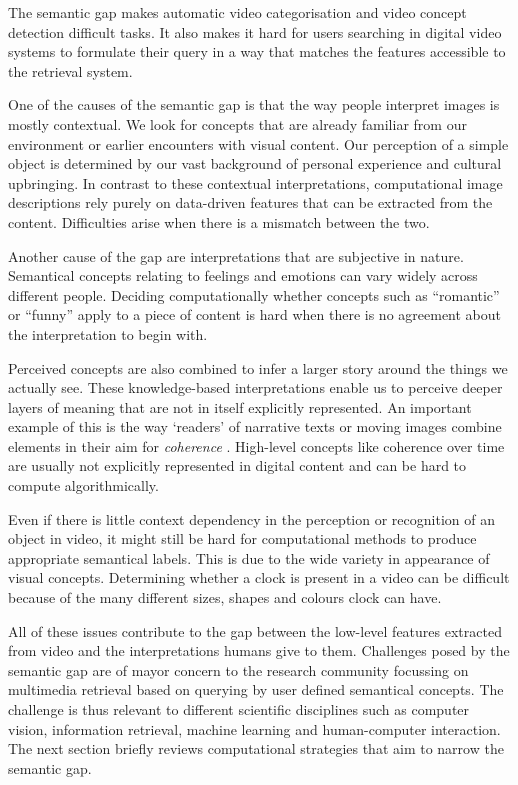 The semantic gap makes automatic video categorisation and video concept detection difficult tasks\cite{Snoek:2009dq}. It also makes it hard for users searching in digital video systems to formulate their query in a way that matches the features accessible to the retrieval system.

One of the causes of the semantic gap is that the way people interpret images is mostly contextual\cite{Smeulders:2000tx}. We look for concepts that are already familiar from our environment or earlier encounters with visual content. Our perception of a simple object is determined by our vast background of personal experience and cultural upbringing. In contrast to these contextual interpretations, computational image descriptions rely purely on data-driven features that can be extracted from the content. Difficulties arise when there is a mismatch between the two.

Another cause of the gap are interpretations that are subjective in nature. Semantical concepts relating to feelings and emotions can vary widely across different people. Deciding computationally whether concepts such as ``romantic'' or ``funny'' apply to a piece of content is hard when there is no agreement about the interpretation to begin with.

Perceived concepts are also combined to infer a larger story around the things we actually see. These knowledge-based interpretations enable us to perceive deeper layers of meaning that are not in itself explicitly represented. An important example of this is the way `readers' of narrative texts or moving images combine elements in their aim for \emph{coherence}\cite[p.~38]{Bordwell:1985tz} \cite{gernsbacher1995coherence, Graesser:1994va}. High-level concepts like coherence over time are usually not explicitly represented in digital content and can be hard to compute algorithmically.

Even if there is little context dependency in the perception or recognition of an object in video, it might still be hard for computational methods to produce appropriate semantical labels. This is due to the wide variety in appearance of visual concepts. Determining whether a clock is present in a video can be difficult because of the many different sizes, shapes and colours clock can have. 

All of these issues contribute to the gap between the low-level features extracted from video and the interpretations humans give to them. Challenges posed by the semantic gap are of mayor concern to the research community focussing on multimedia retrieval based on querying by user defined semantical concepts. The challenge is thus relevant to different scientific disciplines such as computer vision, information retrieval, machine learning and human-computer interaction. The next section briefly reviews computational strategies that aim to narrow the semantic gap.

